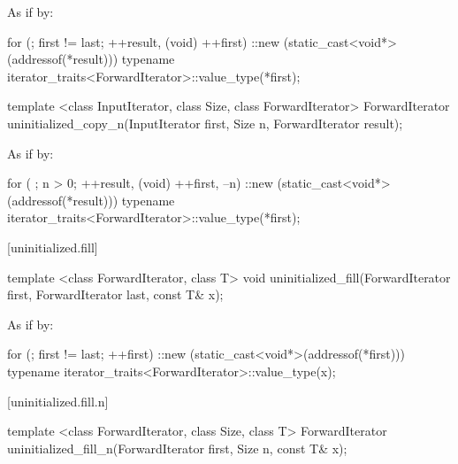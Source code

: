 \begin{itemdescr}
\pnum
\effects
As if by:
\begin{codeblock}
for (; first != last; ++result, (void) ++first)
  ::new (static_cast<void*>(addressof(*result)))
    typename iterator_traits<ForwardIterator>::value_type(*first);
\end{codeblock}

\pnum
\returns
{}
\end{itemdescr}

%
\begin{itemdecl}
template <class InputIterator, class Size, class ForwardIterator>
  ForwardIterator uninitialized_copy_n(InputIterator first, Size n,
                                       ForwardIterator result);
\end{itemdecl}

\begin{itemdescr}
\pnum
\effects
As if by:
\begin{codeblock}
for ( ; n > 0; ++result, (void) ++first, --n) {
  ::new (static_cast<void*>(addressof(*result)))
    typename iterator_traits<ForwardIterator>::value_type(*first);
}
\end{codeblock}

\pnum
\returns {}
\end{itemdescr}


[uninitialized.fill]{}

%
\begin{itemdecl}
template <class ForwardIterator, class T>
  void uninitialized_fill(ForwardIterator first, ForwardIterator last,
                          const T& x);
\end{itemdecl}

\begin{itemdescr}
\pnum
\effects
As if by:
\begin{codeblock}
for (; first != last; ++first)
  ::new (static_cast<void*>(addressof(*first)))
    typename iterator_traits<ForwardIterator>::value_type(x);
\end{codeblock}
\end{itemdescr}

[uninitialized.fill.n]{}

%
\begin{itemdecl}
template <class ForwardIterator, class Size, class T>
  ForwardIterator uninitialized_fill_n(ForwardIterator first, Size n, const T& x);
\end{itemdecl}

